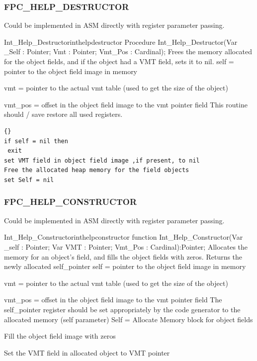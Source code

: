 \documentclass [a4paper,12pt]{article}
\begin{document}
\subsubsection{FPC{\_}HELP{\_}DESTRUCTOR}
\label{subsubsec:mylabel82}

Could be implemented in ASM directly with register parameter passing.

\begin{procedurel}{Int{\_}Help{\_}Destructor}{inthelpdestructor}
\Declaration
Procedure Int{\_}Help{\_}Destructor(Var {\_}Self : Pointer; Vmt : Pointer; Vmt{\_}Pos : Cardinal);
\Description
Frees the memory allocated for the object fields, and if the object had a
VMT field, sets it to nil.
\Parameters
self = pointer to the object field image in memory \par
vmt = pointer to the actual vmt table (used to get the size of the object) \par
vmt{\_}pos = offset in the object field image to the vmt pointer field
\Notes
This routine should / save restore all used registers.
\Algorithm
\begin{lstlisting}{}
if self = nil then
 exit
set VMT field in object field image ,if present, to nil
Free the allocated heap memory for the field objects
set Self = nil
\end{lstlisting}
\end{procedurel}

\subsubsection{FPC{\_}HELP{\_}CONSTRUCTOR}
\label{subsubsec:mylabel83}

Could be implemented in ASM directly with register parameter passing.

\begin{functionl}{Int{\_}Help{\_}Constructor}{inthelpconstructor}
\Declaration
function Int{\_}Help{\_}Constructor(Var {\_}self : Pointer; Var VMT : Pointer; Vmt{\_}Pos : Cardinal):Pointer;
\Description
Allocates the memory for an object's field, and fills the object fields with
zeros. Returns the newly allocated self{\_}pointer
\Parameters
self = pointer to the object field image in memory \par
vmt = pointer to the actual vmt table (used to get the size of the object) \par
vmt{\_}pos = offset in the object field image to the vmt pointer field
\Notes
The self{\_}pointer register should be set appropriately by the code
generator to the allocated memory (self parameter)
\Algorithm
Self = Allocate Memory block for object fields \par
Fill the object field image with zeros\par
Set the VMT field in allocated object to VMT pointer
\end{functionl}
\end{document}
